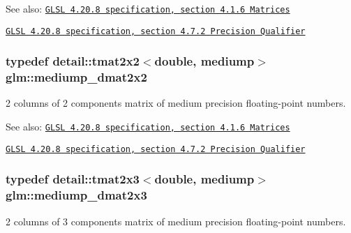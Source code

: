 \begin{Desc}
\item[See also:]\href{http://www.opengl.org/registry/doc/GLSLangSpec.4.20.8.pdf}{\tt GLSL 4.20.8 specification, section 4.1.6 Matrices} 

\href{http://www.opengl.org/registry/doc/GLSLangSpec.4.20.8.pdf}{\tt GLSL 4.20.8 specification, section 4.7.2 Precision Qualifier} \end{Desc}
\hypertarget{group__core__precision_g88ddb4188060ab00fee67c9840f4417e}{
\subsubsection[mediump\_\-dmat2x2]{\setlength{\rightskip}{0pt plus 5cm}typedef detail::tmat2x2$<$double, mediump$>$ {\bf glm::mediump\_\-dmat2x2}}}
\label{group__core__precision_g88ddb4188060ab00fee67c9840f4417e}


2 columns of 2 components matrix of medium precision floating-point numbers.

\begin{Desc}
\item[See also:]\href{http://www.opengl.org/registry/doc/GLSLangSpec.4.20.8.pdf}{\tt GLSL 4.20.8 specification, section 4.1.6 Matrices} 

\href{http://www.opengl.org/registry/doc/GLSLangSpec.4.20.8.pdf}{\tt GLSL 4.20.8 specification, section 4.7.2 Precision Qualifier} \end{Desc}
\hypertarget{group__core__precision_g734e988edf759c7012c443014acb6674}{
\subsubsection[mediump\_\-dmat2x3]{\setlength{\rightskip}{0pt plus 5cm}typedef detail::tmat2x3$<$double, mediump$>$ {\bf glm::mediump\_\-dmat2x3}}}
\label{group__core__precision_g734e988edf759c7012c443014acb6674}


2 columns of 3 components matrix of medium precision floating-point numbers.

